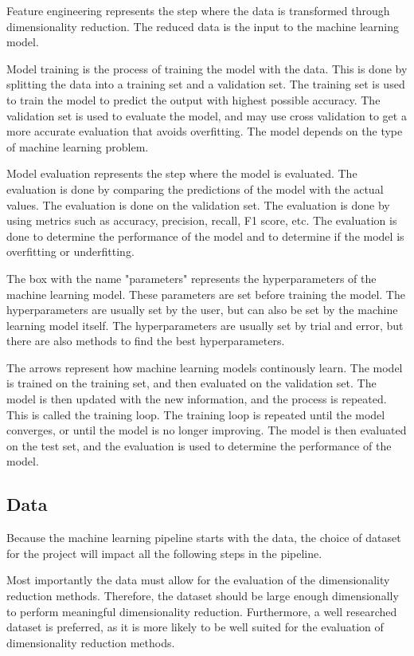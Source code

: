 Feature engineering represents the step where the data is transformed through dimensionality reduction. The reduced data is the input to the machine learning model.

Model training is the process of training the model with the data. This is done by splitting the data into a training set and a validation set. The training set is used to train the model to predict the output with highest possible accuracy. The validation set is used to evaluate the model, and may use cross validation to get a more accurate evaluation that avoids overfitting. The model depends on the type of machine learning problem.

Model evaluation represents the step where the model is evaluated. The evaluation is done by comparing the predictions of the model with the actual values. The evaluation is done on the validation set. The evaluation is done by using metrics such as accuracy, precision, recall, F1 score, etc. The evaluation is done to determine the performance of the model and to determine if the model is overfitting or underfitting.

The box with the name "parameters" represents the hyperparameters of the machine learning model. These parameters are set before training the model. The hyperparameters are usually set by the user, but can also be set by the machine learning model itself. The hyperparameters are usually set by trial and error, but there are also methods to find the best hyperparameters.

The arrows represent how machine learning models continously learn. The model is trained on the training set, and then evaluated on the validation set. The model is then updated with the new information, and the process is repeated. This is called the training loop. The training loop is repeated until the model converges, or until the model is no longer improving. The model is then evaluated on the test set, and the evaluation is used to determine the performance of the model.


\subsection{Data}\label{subsec:data}
Because the machine learning pipeline starts with the data, the choice of dataset for the project will impact all the following steps in the pipeline.

Most importantly the data must allow for the evaluation of the dimensionality reduction methods. Therefore, the dataset should be large enough dimensionally to perform meaningful dimensionality reduction. Furthermore, a well researched dataset is preferred, as it is more likely to be well suited for the evaluation of dimensionality reduction methods.

